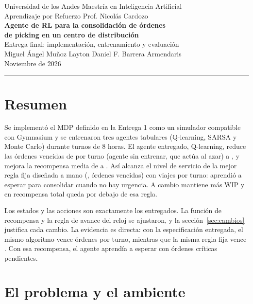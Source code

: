 \documentclass[11pt,letterpaper]{article}
\begin{document}
\begin{center}
  {\small Universidad de los Andes \textperiodcentered{} Maestría en Inteligencia Artificial}\\[2pt]
  {\small Aprendizaje por Refuerzo \textperiodcentered{} Prof. Nicolás Cardozo}\\[10pt]
  {\LARGE\bfseries\color{azul} Agente de RL para la consolidación de órdenes\\[2pt] de picking en un centro de distribución}\\[8pt]
  {\large Entrega final: implementación, entrenamiento y evaluación}\\[8pt]
  Miguel Ángel Muñoz Layton \quad\textperiodcentered\quad Daniel F. Barrera Armendaris\\[2pt]
  {\small Noviembre de 2026}
\end{center}

\vspace{4pt}
\hrule
\vspace{8pt}

\section*{Resumen}

Se implementó el MDP definido en la Entrega 1 como un simulador compatible con Gymnasium y se
entrenaron tres agentes tabulares (Q-learning, SARSA y Monte Carlo) durante \Episodios{} turnos de
8 horas. El agente entregado, Q-learning, reduce las órdenes vencidas de \RandV{} por turno (agente sin
entrenar, que actúa al azar) a \QLV{}, y mejora la recompensa media de \RandR{} a \QLR{}. Así alcanza el nivel de servicio
de la mejor regla fija diseñada a mano (\MejorRegla{}, \UrgV{} órdenes vencidas) con \DifQLViajes{}
viajes por turno: aprendió a esperar para consolidar cuando no hay urgencia. A cambio mantiene más
WIP y en recompensa total queda por debajo de esa regla.

Los estados y las acciones son exactamente los entregados. La función de recompensa y la regla de avance
del reloj se ajustaron, y la sección~\ref{sec:cambios} justifica cada cambio. La evidencia es directa: con
la especificación entregada, el mismo algoritmo vence \EQLV{} órdenes por turno, mientras que la misma
regla fija vence \EUrgV{}. Con esa recompensa, el agente aprendía a esperar con órdenes críticas pendientes.



\section{El problema y el ambiente}
\end{document}
